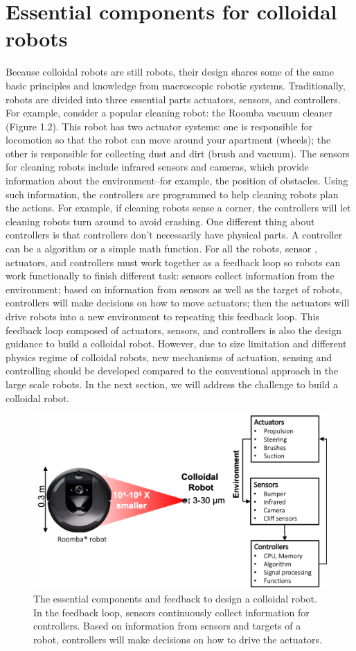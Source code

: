 \section{Essential components for colloidal robots}
Because colloidal robots are still robots, their design shares some of the same basic principles and knowledge from  macroscopic robotic systems.  Traditionally, robots are divided into three essential parts actuators, sensors, and controllers. For example, consider a popular cleaning robot: the Roomba vacuum cleaner (Figure 1.2).  This robot has two actuator systems: one is responsible for locomotion so that the robot can move around your apartment (wheels); the other is responsible for collecting dust and dirt (brush and vacuum).
The sensors for cleaning robots include infrared  sensors and cameras, which provide information about the environment--for example, the position of obstacles. Using such information, the controllers are programmed  to help cleaning robots plan  the actions. For example, if cleaning robots sense a corner, the controllers will let cleaning robots turn around to avoid crashing. One different thing about controllers is that controllers don't necessarily have physical parts. A controller can be a algorithm or a simple math function.  For all the robots, sensor , actuators, and controllers must work together as a feedback loop so robots can work functionally to finish different task: sensors collect information from the environment; based on information from sensors as well as the target of robots,  controllers will make decisions  on how to move actuators; then the actuators will drive robots into a new environment to repeating this feedback loop. This feedback loop composed of actuators, sensors,  and controllers is also the design guidance to build a colloidal robot. However, due to size limitation and different physics regime of colloidal robots, new mechanisms of actuation, sensing and controlling should be developed compared to the conventional approach in the large scale robots.  In the next section, we will address the challenge to build a colloidal robot. 

\begin{figure}
\centering
\includegraphics[width=12cm]{figures/1_2.png}
\caption{The essential components and feedback to design a colloidal robot. In the feedback loop, sensors continuously collect information for controllers. Based on  information from sensors and targets of a robot, controllers will make decisions on how to drive the actuators.}
\label{fig:1.2}
\end{figure}


